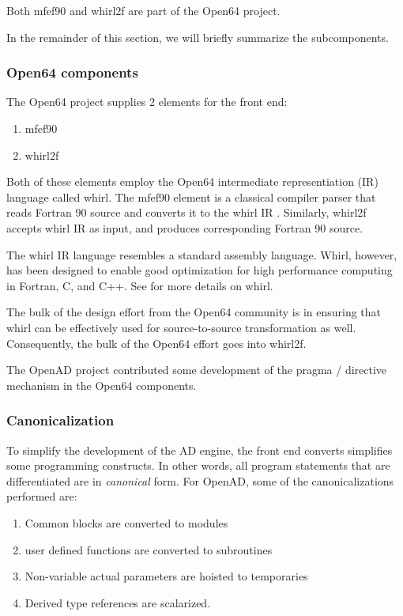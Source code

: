 \documentclass[acmtocl,acmnow]{acmtrans2m}
\begin{document}
Both mfef90 and whirl2f are part of the Open64 project.


In the remainder of this section, we will briefly summarize the
subcomponents.

\subsubsection*{Open64 components}
The Open64 project supplies 2 elements for the front end:
   \begin{enumerate}
      \item mfef90
      \item whirl2f
   \end{enumerate}
Both of these elements employ the Open64 intermediate
representiation (IR) language called whirl. The mfef90 element is a classical
compiler parser that reads Fortran 90 source and converts it to
the whirl IR . Similarly, whirl2f accepts whirl IR as input, and produces
corresponding Fortran 90 source.

The whirl IR language resembles a standard assembly language.
Whirl, however, has been designed to enable good optimization for
high performance computing in Fortran, C, and C++. See \cite{whirl-stuff}
for more details on whirl.

The bulk of the design effort from the Open64 community is in
ensuring that whirl can be effectively used for source-to-source
transformation as well. Consequently, the bulk of the Open64 effort
goes into whirl2f.

The OpenAD project contributed some development of the pragma / directive
mechanism in the Open64 components.

\subsubsection*{Canonicalization}
To simplify the development of the AD engine, the front end converts
simplifies some programming constructs. In other words, all
program statements that are differentiated are in \emph{canonical}
form. For OpenAD, some of the canonicalizations performed are:

   \begin{enumerate}
      \item Common blocks are converted to modules
      \item user defined functions are converted to subroutines
      \item Non-variable actual parameters are hoisted to
            temporaries
      \item Derived type references are scalarized.
   \end{enumerate}
\end{document}
